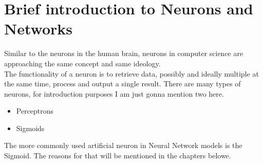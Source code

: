 
\section{Brief introduction to Neurons and Networks}
Similar to the neurons in the human brain, neurons in computer science are approaching the same concept and same ideology.\\
The functionality of a neuron is to retrieve data, possibly and ideally multiple at the same time, process and output a single result. There
are many types of neurons, for introduction purposes I am just gonna mention two here.
\begin{itemize}
    \item Perceptrons
    \item Sigmoids
\end{itemize}
The more commonly used artificial neuron in Neural Network models is the Sigmoid. The reasons for that will be mentioned in the chapters
belowe.

